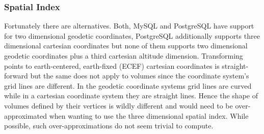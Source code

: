 \documentclass[10pt,conference,compsocconf]{IEEEtran}
\begin{document}
\subsubsection{Spatial Index}
Fortunately there are alternatives.
Both, MySQL and PostgreSQL have support for two dimensional geodetic coordinates, PostgreSQL additionally supports three dimensional cartesian coordinates but none of them supports two dimensional geodetic coordinates plus a third cartesian altitude dimension.
Transforming points to earth-centered, earth-fixed (ECEF) cartesian coordinates is straight-forward but the same does not apply to volumes since the coordinate system's grid lines are different.
In the geodetic coordinate systems grid lines are curved while in a cartesian coordinate system they are straight lines.
Hence the shape of volumes defined by their vertices is wildly different and would need to be over-approximated when wanting to use the three dimensional spatial index.
While possible, such over-approximations do not seem trivial to compute. 
\end{document}
